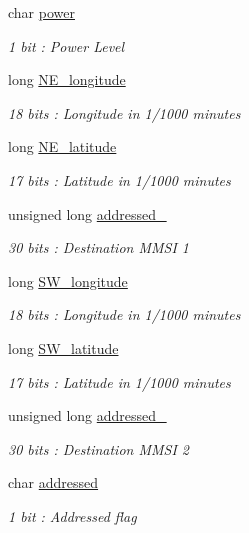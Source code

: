 \begin{DoxyCompactItemize}
char \mbox{\hyperlink{structaismsg__22_ae87a0383c97732f8674653b0d6a3fd10}{power}}
\begin{DoxyCompactList}\small\item\em 1 bit \+: Power Level \end{DoxyCompactList}\item 
long \mbox{\hyperlink{structaismsg__22_aed8d0468e3a9ea3edbdeae19f516326d}{N\+E\+\_\+longitude}}
\begin{DoxyCompactList}\small\item\em 18 bits \+: Longitude in 1/1000 minutes \end{DoxyCompactList}\item 
long \mbox{\hyperlink{structaismsg__22_a7bee3419941b32aa1a43d865251d8bf7}{N\+E\+\_\+latitude}}
\begin{DoxyCompactList}\small\item\em 17 bits \+: Latitude in 1/1000 minutes \end{DoxyCompactList}\item 
unsigned long \mbox{\hyperlink{structaismsg__22_a4bea924a9151daf7eefa6fb66946d3a8}{addressed\+\_}}
\begin{DoxyCompactList}\small\item\em 30 bits \+: Destination M\+M\+SI 1 \end{DoxyCompactList}\item 
long \mbox{\hyperlink{structaismsg__22_a9935056db59b3a0ba7037fb7e5c3468b}{S\+W\+\_\+longitude}}
\begin{DoxyCompactList}\small\item\em 18 bits \+: Longitude in 1/1000 minutes \end{DoxyCompactList}\item 
long \mbox{\hyperlink{structaismsg__22_ae80faa358d573074daba810134427863}{S\+W\+\_\+latitude}}
\begin{DoxyCompactList}\small\item\em 17 bits \+: Latitude in 1/1000 minutes \end{DoxyCompactList}\item 
unsigned long \mbox{\hyperlink{structaismsg__22_a6fbf36e1da211c96dcdde63d4a0f7b30}{addressed\+\_}}
\begin{DoxyCompactList}\small\item\em 30 bits \+: Destination M\+M\+SI 2 \end{DoxyCompactList}\item 
char \mbox{\hyperlink{structaismsg__22_ac3ed55d23d45cda49607dffb82ebca40}{addressed}}
\begin{DoxyCompactList}\small\item\em 1 bit \+: Addressed flag \end{DoxyCompactList}\item 

\end{DoxyCompactItemize}
